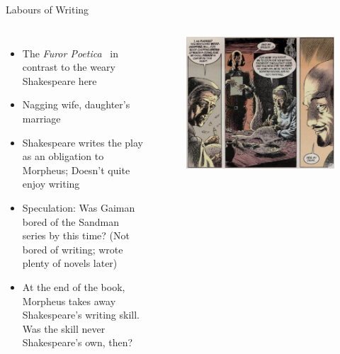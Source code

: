 \documentclass{beamer}
\begin{document}
  \begin{frame}{Labours of Writing}
    \begin{columns}[c]
      \begin{itemize}
      \item The \emph{Furor Poetica}~\cite{gaimanmnd} in contrast to the weary Shakespeare here
      \item Nagging wife, daughter's marriage
      \item Shakespeare writes the play as an obligation to Morpheus; Doesn't quite enjoy writing
      \item Speculation: Was Gaiman bored of the Sandman series by this time? (Not bored of writing; wrote plenty of novels later)
      \item At the end of the book, Morpheus takes away Shakespeare's writing skill. Was the skill never Shakespeare's own, then?
      \end{itemize}
      \begin{figure}[htp]
        \begin{center}
          \centering
          \includegraphics[scale=0.2]{../Presentation/nagging.jpg}
        \end{center}
      \end{figure}
      

\end{columns}
\end{frame}
\end{document}
